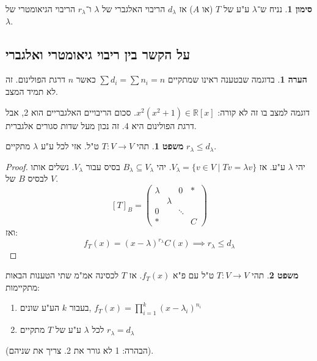 \documentclass[a4paper]{article}
\newcommand\R     {\mathbb{R}}
\newcommand\F         {\mathbb{F}}
\newcommand\co        {\colon}
\newcommand\pms[1]    {\begin{pmatrix}
		#1
\end{pmatrix}}
\renewcommand\lg      {\lambda}
\theoremstyle{definition}
\newtheorem{Theorem}{\color{myblue}משפט}
\newtheorem{Remark}{\color{mycyan}הערה}
\newtheorem{Notion}{\color{myred}סימון}
\newcommand\theo  [1] {\begin{Theorem}#1\end{Theorem}}
\newcommand\rmark [1] {\begin{Remark}#1\end{Remark}}
\newcommand\noti  [1] {\begin{Notion}#1\end{Notion}}
\begin{document}
	\noti{נניח ש־$\lg$ ע"ע של $T$ (או $A$) אז $d_\lg$ הריבוי האלגברי של $\lg$ ו־$r_\lg$ הריבוי הגיאומטרי של $\lg$. }
	\subsection{על הקשר בין ריבוי גיאומטרי ואלגברי}
	
%		
	\rmark{בדוגמה שבטענה ראינו שמתקיים $\sum d_i = \sum n_i = n$ כאשר $n$ דרגת הפולינום. זה לא תמיד המצב. 
	
	דוגמה למצב בו זה לא קורה: $x^2(x^2 + 1) \in \R[x]$. סכום הריבויים האלגבריים הוא 2, אבל דרגת הפולינום היא 4. זה נכון מעל שדות סגורים אלגברית. }
	
	
	\theo{תהי $T \co V \to V$ ט"ל. אזי לכל ע"ע $\lg$ מתקיים $r_\lg \le d_\lg$. }
	\begin{proof}
		יהי $\lg$ ע"ע. אז $V_\lg = \{v \in V \mid Tv = \lg v\}$. יהי $B_\lg \subseteq V_\lg$ בסיס עבור $V_\lg$. נשלים אותו לבסיס $B$ של $V$. 
		\[ [T]_B = \pms{\lg & & 0 & * \\ & \lg &  & \\ 0 && \ddots & \\ *&&& C} \]
		ואז: 
		\[ f_T(x) = (x - \lg)^{r_\lg}C(x) \implies r_\lg \le d_\lg \]
	\end{proof}
	
	\theo{תהי $T \co V \to V$ ט"ל עם פ"א $f_T(x)$. אז $T$ לכסינה אמ"מ שתי הטענות הבאות מתקיימות:
		\begin{enumerate}
			\item בעבור $k$ הע"ע שונים, $f_T(x) = \prod_{i = 1}^{k}(x - \lg_i)^{n_i}$
			\item לכל $\lg$ ע"ע של $T$ מתקיים $r_\lg = d_\lg$
		\end{enumerate}
	}
	(הבהרה: 1 לא גורר את 2. צריך את שניהם). 
	
\end{document}
